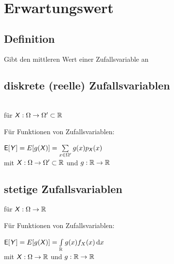 \documentclass[german,color,6pt]{latex4ei/latex4ei_sheet}
\begin{document}


\vfill 
\section{Erwartungswert}
\begin{sectionbox}
	\subsection{Definition}
	Gibt den mittleren Wert einer Zufallsvariable an
\end{sectionbox}

\begin{sectionbox}
	\subsection{diskrete (reelle) Zufallsvariablen}
	 \\
	für $\operatorname{\textsf{\textit{X}}}: \Omega \rightarrow \Omega' \subset \mathbb R$ 
	
	Für Funktionen von Zufallsvariablen:
	
	$\operatorname{\textsf{E}}[\operatorname{\textsf{\textit{Y}}}] = E[g(\operatorname{\textsf{\textit{X}}})] = \sum \limits_{x \in \Omega'} g(x) p_{\operatorname{\textsf{\textit{X}}}} (x)$\\
	mit $\operatorname{\textsf{\textit{X}}} : \Omega \rightarrow \Omega' \subset \mathbb R$ und $g: \mathbb R \rightarrow \mathbb R$
\end{sectionbox}

\begin{sectionbox}
	\subsection{stetige Zufallsvariablen}
	 für $\operatorname{\textsf{\textit{X}}} : \Omega \rightarrow \mathbb R$
	
	Für Funktionen von Zufallsvariablen:
	
	$\E[\Y] = E[g(\X)] = \int \limits_{\mathbb R} g(x) f_X (x) \diff x$\\
	mit $\operatorname{\textsf{\textit{X}}} : \Omega \rightarrow \mathbb R $ und $g: \mathbb R \rightarrow \mathbb R$
\end{sectionbox}
\end{document}
